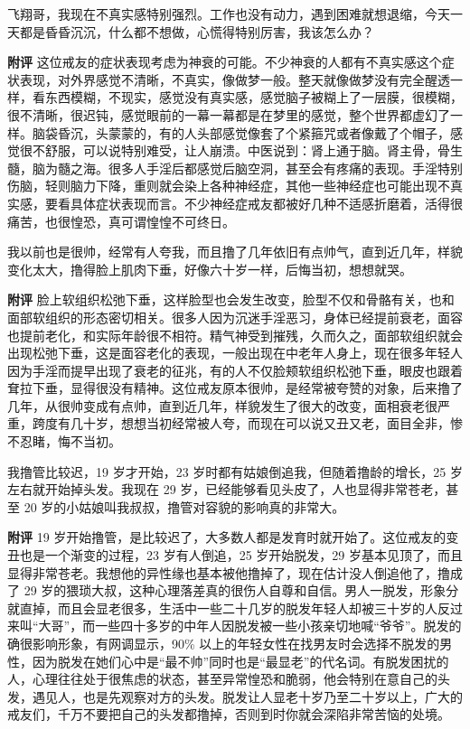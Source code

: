 \begin{case}
    飞翔哥，我现在不真实感特别强烈。工作也没有动力，遇到困难就想退缩，今天一天都是昏昏沉沉，什么都不想做，心慌得特别厉害，我该怎么办？

    \textbf{附评} 这位戒友的症状表现考虑为神衰的可能。不少神衰的人都有不真实感这个症状表现，对外界感觉不清晰，不真实，像做梦一般。整天就像做梦没有完全醒透一样，看东西模糊，不现实，感觉没有真实感，感觉脑子被糊上了一层膜，很模糊，很不清晰，很迟钝，感觉眼前的一幕一幕都是在梦里的感觉，整个世界都虚幻了一样。脑袋昏沉，头蒙蒙的，有的人头部感觉像套了个紧箍咒或者像戴了个帽子，感觉很不舒服，可以说特别难受，让人崩溃。中医说到：肾上通于脑。肾主骨，骨生髓，脑为髓之海。很多人手淫后都感觉后脑空洞，甚至会有疼痛的表现。手淫特别伤脑，轻则脑力下降，重则就会染上各种神经症，其他一些神经症也可能出现不真实感，要看具体症状表现而言。不少神经症戒友都被好几种不适感折磨着，活得很痛苦，也很惶恐，真可谓惶惶不可终日。
\end{case}

\begin{case}
    我以前也是很帅，经常有人夸我，而且撸了几年依旧有点帅气，直到近几年，样貌变化太大，撸得脸上肌肉下垂，好像六十岁一样，后悔当初，想想就哭。

    \textbf{附评} 脸上软组织松弛下垂，这样脸型也会发生改变，脸型不仅和骨骼有关，也和面部软组织的形态密切相关。很多人因为沉迷手淫恶习，身体已经提前衰老，面容也提前老化，和实际年龄很不相符。精气神受到摧残，久而久之，面部软组织就会出现松弛下垂，这是面容老化的表现，一般出现在中老年人身上，现在很多年轻人因为手淫而提早出现了衰老的征兆，有的人不仅脸颊软组织松弛下垂，眼皮也跟着耷拉下垂，显得很没有精神。这位戒友原本很帅，是经常被夸赞的对象，后来撸了几年，从很帅变成有点帅，直到近几年，样貌发生了很大的改变，面相衰老很严重，跨度有几十岁，想想当初经常被人夸，而现在可以说又丑又老，面目全非，惨不忍睹，悔不当初。
\end{case}

\begin{case}
    我撸管比较迟，19 岁才开始，23 岁时都有姑娘倒追我，但随着撸龄的增长，25 岁左右就开始掉头发。我现在 29 岁，已经能够看见头皮了，人也显得非常苍老，甚至 20 岁的小姑娘叫我叔叔，撸管对容貌的影响真的非常大。

    \textbf{附评} 19 岁开始撸管，是比较迟了，大多数人都是发育时就开始了。这位戒友的变丑也是一个渐变的过程，23 岁有人倒追，25 岁开始脱发，29 岁基本见顶了，而且显得非常苍老。我想他的异性缘也基本被他撸掉了，现在估计没人倒追他了，撸成了 29 岁的猥琐大叔，这种心理落差真的很伤人自尊和自信。男人一脱发，形象分就直掉，而且会显老很多，生活中一些二十几岁的脱发年轻人却被三十岁的人反过来叫“大哥”，而一些四十多岁的中年人因脱发被一些小孩亲切地喊“爷爷”。脱发的确很影响形象，有网调显示，90\% 以上的年轻女性在找男友时会选择不脱发的男性，因为脱发在她们心中是“最不帅”同时也是“最显老”的代名词。有脱发困扰的人，心理往往处于很焦虑的状态，甚至异常惶恐和脆弱，他会特别在意自己的头发，遇见人，也是先观察对方的头发。脱发让人显老十岁乃至二十岁以上，广大的戒友们，千万不要把自己的头发都撸掉，否则到时你就会深陷非常苦恼的处境。
\end{case}

